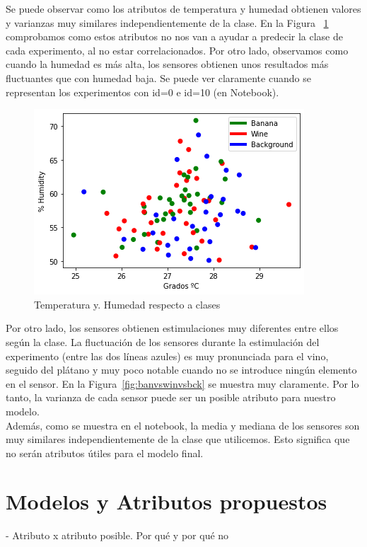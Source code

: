 \documentclass{esannV2}
\begin{document}
Se puede observar como los atributos de temperatura y humedad obtienen valores  y varianzas muy similares independientemente de la clase. En la Figura ~\ref{fig:tempvshum} comprobamos como estos atributos no nos van a ayudar a predecir la clase de cada experimento, al no estar correlacionados. Por otro lado, observamos como cuando la humedad es más alta, los sensores obtienen unos resultados más fluctuantes que con humedad baja. Se puede ver claramente cuando se representan los experimentos con id=0 e id=10 (en Notebook).

\begin{figure}[b!]
\centering
\includegraphics[scale=0.5]{img/temp_hum.png}
\caption{Temperatura y. Humedad respecto a clases}\label{fig:tempvshum}
\end{figure}

Por otro lado, los sensores obtienen estimulaciones muy diferentes entre ellos según la clase. La fluctuación de los sensores durante la estimulación del experimento (entre las dos líneas azules)  es muy pronunciada para el vino, seguido del plátano y muy poco notable cuando no se introduce ningún elemento en el sensor. En la Figura~\ref{fig:banvswinvsbck} se muestra muy claramente. Por lo tanto, la varianza de cada sensor puede ser un posible atributo para nuestro modelo. \\
Además, como se muestra en el notebook, la media y mediana de los sensores son muy similares independientemente de la clase que utilicemos. Esto significa que no serán atributos útiles para el modelo final.


\section{Modelos y Atributos propuestos}

- Atributo x atributo posible. Por qué y por qué no
\end{document}
